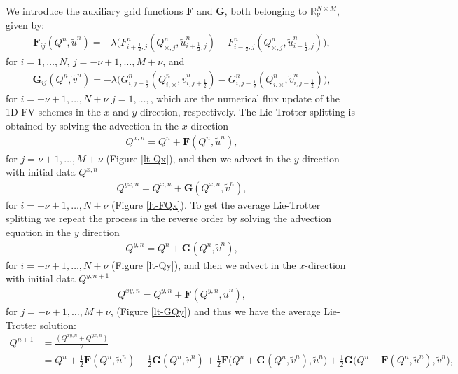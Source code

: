 We introduce the auxiliary grid functions $\mathbf{F}$ and $\mathbf{G}$, both belonging to $\mathbb{R}^{N\times M}_{\nu}$, given by:
\begin{align*}
	\mathbf{F}_{ij}({Q^n,\tilde{u}^n}) = -\lambda \big({F}_{i+\frac{1}{2},j}^n(Q^n_{\times,j},\tilde{u}^n_{i+\frac{1}{2},j})-
                                                  {F}_{i-\frac{1}{2},j}^n(Q^n_{\times,j},\tilde{u}^n_{i-\frac{1}{2},j}) \big),
\end{align*}
for $i=1, \ldots, N$, $j=-\nu+1, \ldots, M + \nu$, and
\begin{align*}
	\mathbf{G}_{ij}({Q^n,\tilde{v}^n}) = -\lambda \big({G}_{i,j+\frac{1}{2}}^n(Q^n_{i,\times},\tilde{v}^n_{i,j+\frac{1}{2}})-
                                                  {G}_{i,j-\frac{1}{2}}^n(Q^n_{i,\times},\tilde{v}^n_{i,j-\frac{1}{2}}) \big),
\end{align*}
for $i=-\nu+1, \ldots, N + \nu$  $j=1, \ldots, $,
which are the numerical flux update of the 1D-FV schemes in the $x$ and $y$ direction, respectively.
The Lie-Trotter splitting is obtained by solving the advection in the $x$ direction
\begin{align*}
	{Q}^{x,n} =  {Q}^{n} + \mathbf{F}({Q^n}, \tilde{u}^n),
\end{align*}
for $j=\nu+1, \ldots, M+\nu$ (Figure \ref{lt-Qx}), and then we advect in the $y$ direction with initial data ${Q}^{x,n}$ 
\begin{align*}
	{Q}^{yx,n} = Q^{x,n} + \mathbf{G}({Q}^{x,n},\tilde{v}^n),
\end{align*}
for $i=-\nu+1, \ldots, N+\nu$ (Figure \ref{lt-FQx}).
To get the average Lie-Trotter splitting we repeat the process in the reverse order by solving the advection equation
in the $y$ direction
\begin{align*}
	{Q}^{y,n} =  {Q}^{n} + \mathbf{G}({Q^n},\tilde{v}^n),
\end{align*}
for $i=-\nu+1, \ldots, N+\nu$ (Figure \ref{lt-Qy}), and then we advect in the $x$-direction with initial data ${Q}^{y,n+1}$ 
\begin{align*}
	{Q}^{xy,n} = Q^{y,n} + \mathbf{F}(Q^{y,n},\tilde{u}^n),
\end{align*}
for $j=-\nu+1, \ldots, M+\nu$, (Figure \ref{lt-GQy}) and thus we have the average Lie-Trotter solution:
\begin{align*}
	Q^{n+1} &= \frac{(Q^{xy,n} + Q^{yx,n})}{2} \\
    &= Q^n + \frac{1}{2}\mathbf{F}(Q^n,\tilde{u}^n) + \frac{1}{2}\mathbf{G}(Q^n,\tilde{v}^n) + 
    \frac{1}{2}\mathbf{F}\bigg(Q^n + \mathbf{G}(Q^n, \tilde{v}^n), \tilde{u}^n\bigg)+
    \frac{1}{2}\mathbf{G}\bigg(Q^n + \mathbf{F}(Q^n, \tilde{u}^n), \tilde{v}^n\bigg),
\end{align*}
